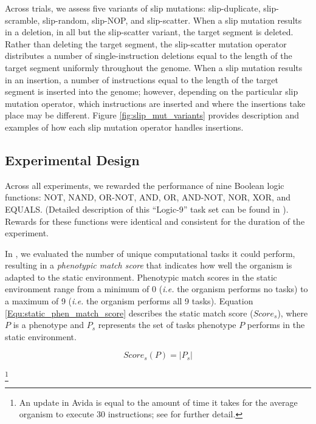 Across trials, we assess five variants of slip mutations: slip-duplicate, slip-scramble, slip-random, slip-NOP, and slip-scatter. When a slip mutation results in a deletion, in all but the slip-scatter variant, the target segment is deleted. Rather than deleting the target segment, the slip-scatter mutation operator distributes a number of single-instruction deletions equal to the length of the target segment uniformly throughout the genome. When a slip mutation results in an insertion, a number of instructions equal to the length of the target segment is inserted into the genome; however, depending on the particular slip mutation operator, which instructions are inserted and where the insertions take place may be different. Figure \ref{fig:slip_mut_variants} provides description and examples of how each slip mutation operator handles insertions.

\subsection{Experimental Design}

Across all experiments, we rewarded the performance of nine Boolean logic functions: NOT, NAND, OR-NOT, AND, OR, AND-NOT, NOR, XOR, and EQUALS.
(Detailed description of this ``Logic-9'' task set can be found in \citet{lenski2003evolutionary}).
Rewards for these functions were identical and consistent for the duration of the experiment.

In , we evaluated the number of unique computational tasks it could perform, resulting in a \textit{phenotypic match score} that indicates how well the organism is adapted to the static environment. Phenotypic match scores in the static environment range from a minimum of 0 (\textit{i.e.} the organism performs no tasks) to a maximum of 9 (\textit{i.e.} the organism performs all 9 tasks). %
Equation \ref{Equ:static_phen_match_score} describes the static match score ($Score_s$), where $P$ is a phenotype and $P_s$ represents the set of tasks phenotype $P$ performs in the static environment.

\begin{equation}
Score_s(P) = |P_{s}|
\label{Equ:static_phen_match_score}
\end{equation}

\footnote{An update in Avida is equal to the amount of time it takes for the average organism to execute 30 instructions; see \citep{Ofria:2009avida} for further detail.}

